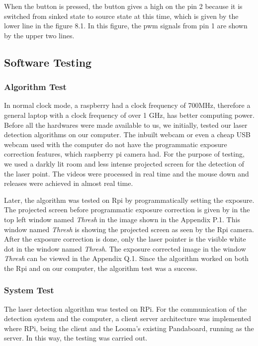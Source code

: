 \documentclass[12pt, a4paper]{article}
\begin{document}
When the button is pressed, the button gives a high on the pin 2 because it is switched from sinked state to source state at this time, which is given by the lower line in the figure 8.1. In this figure, the pwm signals from pin 1 are shown by the upper two lines.

\subsection{Software Testing}
\subsubsection{Algorithm Test}
In normal clock mode, a raspberry had a clock frequency of 700MHz, therefore a general laptop with a clock frequency of over 1 GHz, has better computing power. Before all the hardwares were made available to us, we initially, tested our laser detection algorithms on our computer. The inbuilt webcam or even a cheap USB webcam used with the computer do not have the programmatic exposure correction features, which raspberry pi camera had. For the purpose of testing, we used a darkly lit room and less intense projected screen for the detection of the laser point. The videos were processed in real time and the mouse down and releases were achieved in almost real time. 

	Later, the algorithm was tested on Rpi by programmatically setting the exposure. The projected screen before programmatic exposure correction is given by in the top left window named \emph{Thresh} in the image shown in the Appendix P.1. This window named \emph{Thresh} is showing the projected screen as seen by the Rpi camera. After the exposure correction is done, only the laser pointer is the visible white dot in the window named \emph{Thresh}. The exposure corrected image in the window \emph{Thresh} can be viewed in the Appendix Q.1. Since the algorithm worked on both the Rpi and on our computer, the algorithm test was a success. 

\subsubsection{System Test}

The laser detection algorithm was tested on RPi. For the communication of the detection system and the computer, a client server architecture was implemented where RPi, being the client and the Looma’s existing Pandaboard, running as the server. In this way, the testing was carried out.
\end{document}
